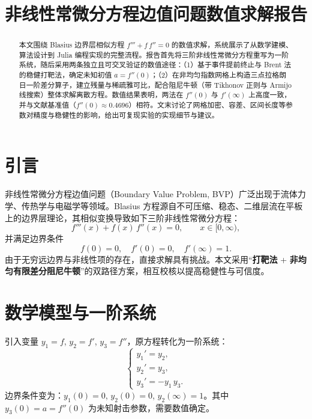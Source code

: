 \documentclass[12pt]{article}
\title{\bfseries 非线性常微分方程边值问题数值求解报告}
\author{\normalsize }
\date{\normalsize }
\begin{document}
\maketitle

\begin{abstract}
本文围绕 Blasius 边界层相似方程 \(f''' + f\,f'' = 0\) 的数值求解，系统展示了从数学建模、算法设计到 Julia 编程实现的完整流程。报告首先将三阶非线性常微分方程重写为一阶系统，随后采用两条独立且可交叉验证的数值途径：（1）基于事件提前终止与 Brent 法的稳健打靶法，确定未知初值 \(a=f''(0)\)；（2）在非均匀指数网格上构造三点拉格朗日一阶差分算子，建立残量与稀疏雅可比，配合阻尼牛顿（带 Tikhonov 正则与 Armijo 线搜索）整体求解离散方程。数值结果表明，两法在 \(f''(0)\) 与 \(f'(\infty)\) 上高度一致，并与文献基准值（\(f''(0)\approx 0.4696\)）相符。文末讨论了网格加密、容差、区间长度等参数对精度与稳健性的影响，给出可复现实验的实现细节与建议。
\end{abstract}

\section{引言}
非线性常微分方程边值问题（Boundary Value Problem, BVP）广泛出现于流体力学、传热学与电磁学等领域。Blasius 方程源自不可压缩、稳态、二维层流在平板上的边界层理论，其相似变换导致如下三阶非线性常微分方程：
\begin{equation}
  f'''(x) + f(x)\, f''(x) = 0, \qquad x\in [0, \infty),
\end{equation}
并满足边界条件
\begin{equation}
  f(0)=0,\quad f'(0)=0,\quad f'(\infty)=1.
\end{equation}
由于无穷远边界与非线性项的存在，直接求解具有挑战。本文采用“\textbf{打靶法} + \textbf{非均匀有限差分阻尼牛顿}”的双路径方案，相互校核以提高稳健性与可信度。

\section{数学模型与一阶系统}
引入变量 \(y_1=f\), \(y_2=f'\), \(y_3=f''\)，原方程转化为一阶系统：
\begin{equation}
  \begin{cases}
    y_1' = y_2, \\
    y_2' = y_3, \\
    y_3' = - y_1\, y_3.
  \end{cases}
  \label{eq:firstorder}
\end{equation}
边界条件变为：\(y_1(0)=0\), \(y_2(0)=0\), \(y_2(\infty)=1\)。其中 \(y_3(0)=a=f''(0)\) 为未知射击参数，需要数值确定。
\end{document}
